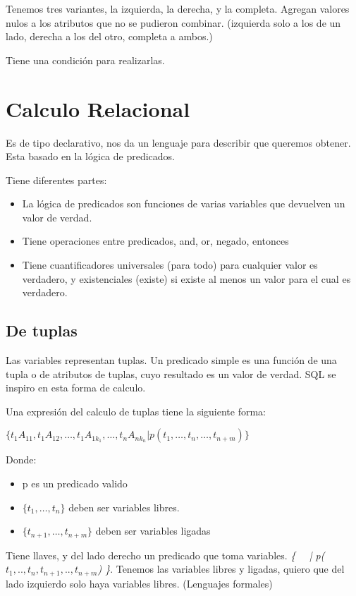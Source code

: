 Tenemos tres variantes, la izquierda, la derecha, y la completa.
Agregan valores nulos a los atributos que no se pudieron combinar. (izquierda solo a los de un lado, derecha a los del otro, completa a ambos.)

Tiene una condición para realizarlas.

\newpage
\section{Calculo Relacional}
Es de tipo declarativo, nos da un lenguaje para describir que queremos obtener. Esta basado en la lógica de predicados. 

Tiene diferentes partes:
\begin{itemize}
\item La lógica de predicados son funciones de varias variables que devuelven un valor de verdad.
\item Tiene operaciones entre predicados, and, or, negado, entonces
\item Tiene cuantificadores universales (para todo) para cualquier valor es verdadero, y existenciales (existe) si existe al menos un valor para el cual es verdadero.
\end{itemize}


\subsection*{De tuplas}
Las variables representan tuplas. Un predicado simple es una función de una tupla o de atributos de tuplas, cuyo resultado es un valor de verdad. SQL se inspiro en esta forma de calculo.

Una expresión del calculo de tuplas tiene la siguiente forma:

\begin{center}
    $ \{ t_{1} A_{11}, t_{1} A_{12}, \ldots , t_{1} A_{1k_{1}}, \ldots ,  t_{n} A_{nk_{n}} | p(t_{1}, \ldots , t_{n} , \ldots , t_{n+m})  \} $
\end{center}

Donde:
\begin{itemize}
    \item p es un predicado valido
    \item $ \{ t_{1},\ldots,t_{n} \} $ deben ser variables libres.
    \item $ \{ t_{n+1},\ldots,t_{n+m} \} $ deben ser variables ligadas
\end{itemize}

Tiene llaves, y del lado derecho un predicado que toma variables. \textit{\{ \ \ | p($t_{1},..,t_{n},t_{n+1},..,t_{n+m}$) \}}. Tenemos las variables libres y ligadas, quiero que del lado izquierdo solo haya variables libres. (Lenguajes formales)

